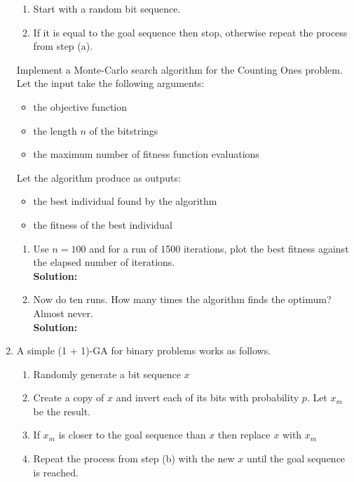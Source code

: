 \documentclass[a4paper]{article}
\begin{document}
\begin{enumerate}
	\begin{enumerate}
		\item Start with a random bit sequence.
		\item If it is equal to the goal sequence then stop, otherwise repeat the process from step (a).
	\end{enumerate}
	
	Implement a Monte-Carlo search algorithm for the Counting Ones problem. Let the input take the following arguments:
	
	\begin{itemize}
		\item the objective function
		\item the length $n$ of the bitstrings
		\item the maximum number of fitness function evaluations
\end{itemize}

Let the algorithm produce as outputs:

\begin{itemize}
	\item the best individual found by the algorithm
	\item the fitness of the best individual
\end{itemize}

\begin{enumerate}
	\item Use $n = 100$ and for a run of 1500 iterations, plot the best fitness against the elapsed number of iterations.\\
	\textbf{Solution:}\\
	
	\item Now do ten runs. How many times the algorithm finds the optimum? Almost never.\\
	\textbf{Solution:}\\
	
	
\end{enumerate}			
	
	\item A simple (1 + 1)-GA for binary problems works as follows.
	
		\begin{enumerate}
			\item Randomly generate a bit sequence $x$
			\item Create a copy of $x$ and invert each of its bits with probability $p$. Let $x_m$ be the result.
			\item If $x_m$ is closer to the goal sequence than $x$ then replace $x$ with $x_m$
			\item Repeat the process from step (b) with the new $x$ until the goal sequence is reached.
		\end{enumerate}


\end{enumerate}
\end{document}
